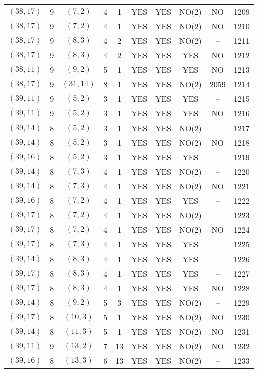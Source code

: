 \begin{longtable}{|c|c|c|c|c|c|c|c|c|c|}
$(38, 17)$ & 9 & $(7, 2)$ & 4 & 1 & YES & YES & NO(2) & NO & 1209\\
$(38, 17)$ & 9 & $(7, 2)$ & 4 & 1 & YES & YES & NO(2) & NO & 1210\\
$(38, 17)$ & 9 & $(8, 3)$ & 4 & 2 & YES & YES & NO(2) & -- & 1211\\
$(38, 17)$ & 9 & $(8, 3)$ & 4 & 2 & YES & YES & YES & NO & 1212\\
$(38, 11)$ & 9 & $(9, 2)$ & 5 & 1 & YES & YES & YES & NO & 1213\\
$(38, 17)$ & 9 & $(31, 14)$ & 8 & 1 & YES & YES & NO(2) & 2059 & 1214\\
$(39, 11)$ & 9 & $(5, 2)$ & 3 & 1 & YES & YES & YES & -- & 1215\\
$(39, 11)$ & 9 & $(5, 2)$ & 3 & 1 & YES & YES & YES & NO & 1216\\
$(39, 14)$ & 8 & $(5, 2)$ & 3 & 1 & YES & YES & NO(2) & -- & 1217\\
$(39, 14)$ & 8 & $(5, 2)$ & 3 & 1 & YES & YES & NO(2) & NO & 1218\\
$(39, 16)$ & 8 & $(5, 2)$ & 3 & 1 & YES & YES & YES & -- & 1219\\
$(39, 14)$ & 8 & $(7, 3)$ & 4 & 1 & YES & YES & NO(2) & -- & 1220\\
$(39, 14)$ & 8 & $(7, 3)$ & 4 & 1 & YES & YES & NO(2) & NO & 1221\\
$(39, 16)$ & 8 & $(7, 2)$ & 4 & 1 & YES & YES & YES & -- & 1222\\
$(39, 17)$ & 8 & $(7, 2)$ & 4 & 1 & YES & YES & NO(2) & -- & 1223\\
$(39, 17)$ & 8 & $(7, 2)$ & 4 & 1 & YES & YES & NO(2) & NO & 1224\\
$(39, 17)$ & 8 & $(7, 3)$ & 4 & 1 & YES & YES & YES & -- & 1225\\
$(39, 14)$ & 8 & $(8, 3)$ & 4 & 1 & YES & YES & YES & -- & 1226\\
$(39, 17)$ & 8 & $(8, 3)$ & 4 & 1 & YES & YES & YES & -- & 1227\\
$(39, 17)$ & 8 & $(8, 3)$ & 4 & 1 & YES & YES & YES & NO & 1228\\
$(39, 14)$ & 8 & $(9, 2)$ & 5 & 3 & YES & YES & NO(2) & -- & 1229\\
$(39, 17)$ & 8 & $(10, 3)$ & 5 & 1 & YES & YES & NO(2) & NO & 1230\\
$(39, 14)$ & 8 & $(11, 3)$ & 5 & 1 & YES & YES & NO(2) & NO & 1231\\
$(39, 11)$ & 9 & $(13, 2)$ & 7 & 13 & YES & YES & NO(2) & NO & 1232\\
$(39, 16)$ & 8 & $(13, 3)$ & 6 & 13 & YES & YES & NO(2) & -- & 1233\\

\end{longtable}
